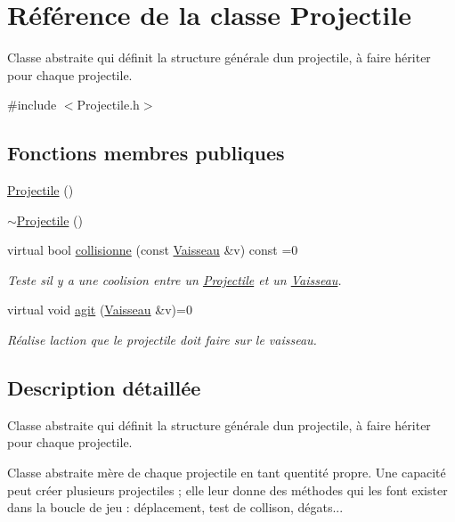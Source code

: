\hypertarget{class_projectile}{}\section{Référence de la classe Projectile}
\label{class_projectile}


Classe abstraite qui définit la structure générale d\textquotesingle{}un projectile, à faire hériter pour chaque projectile.  




{\ttfamily \#include $<$Projectile.\+h$>$}

\subsection*{Fonctions membres publiques}
\begin{DoxyCompactItemize}
\item 
\hyperlink{class_projectile_ac536ed2aad56af866a2078b9a85aa16d}{Projectile} ()
\item 
\hyperlink{class_projectile_a94903e021fa2edab60ba3836ca0b937d}{$\sim$\+Projectile} ()
\item 
virtual bool \hyperlink{class_projectile_aa5d38357da8a5fdc622b248a449523a5}{collisionne} (const \hyperlink{class_vaisseau}{Vaisseau} \&v) const =0
\begin{DoxyCompactList}\small\item\em Teste s\textquotesingle{}il y a une coolision entre un {\ttfamily \hyperlink{class_projectile}{Projectile}} et un {\ttfamily \hyperlink{class_vaisseau}{Vaisseau}}. \end{DoxyCompactList}\item 
virtual void \hyperlink{class_projectile_a8550c8b1b012c5c290fb6da5b06f57ef}{agit} (\hyperlink{class_vaisseau}{Vaisseau} \&v)=0
\begin{DoxyCompactList}\small\item\em Réalise l\textquotesingle{}action que le projectile doit faire sur le vaisseau. \end{DoxyCompactList}\end{DoxyCompactItemize}


\subsection{Description détaillée}
Classe abstraite qui définit la structure générale d\textquotesingle{}un projectile, à faire hériter pour chaque projectile. 

Classe abstraite mère de chaque projectile en tant qu\textquotesingle{}entité propre. Une capacité peut créer plusieurs projectiles ; elle leur donne des méthodes qui les font exister dans la boucle de jeu \+: déplacement, test de collison, dégats... 

